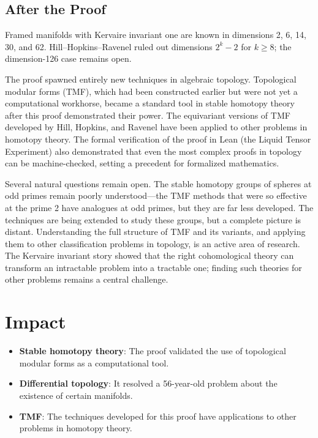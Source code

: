 \subsection{After the Proof}

Framed manifolds with Kervaire invariant one are known in dimensions 2, 6, 14, 30, and 62. Hill--Hopkins--Ravenel ruled out dimensions $2^k-2$ for $k\geq8$; the dimension-126 case remains open.

The proof spawned entirely new techniques in algebraic topology. Topological modular forms (TMF), which had been constructed earlier but were not yet a computational workhorse, became a standard tool in stable homotopy theory after this proof demonstrated their power. The equivariant versions of TMF developed by Hill, Hopkins, and Ravenel have been applied to other problems in homotopy theory. The formal verification of the proof in Lean (the Liquid Tensor Experiment) also demonstrated that even the most complex proofs in topology can be machine-checked, setting a precedent for formalized mathematics.

Several natural questions remain open. The stable homotopy groups of spheres at odd primes remain poorly understood---the TMF methods that were so effective at the prime 2 have analogues at odd primes, but they are far less developed. The techniques are being extended to study these groups, but a complete picture is distant. Understanding the full structure of TMF and its variants, and applying them to other classification problems in topology, is an active area of research. The Kervaire invariant story showed that the right cohomological theory can transform an intractable problem into a tractable one; finding such theories for other problems remains a central challenge.

\section{Impact}

\begin{itemize}
\item \textbf{Stable homotopy theory}: The proof validated the use of topological modular forms as a computational tool.
\item \textbf{Differential topology}: It resolved a 56-year-old problem about the existence of certain manifolds.
\item \textbf{TMF}: The techniques developed for this proof have applications to other problems in homotopy theory.
\end{itemize}

